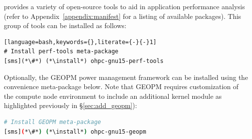\OHPC{} provides a variety of open-source tools to aid in application
performance analysis (refer to Appendix~\ref{appendix:manifest} for a listing
of available packages). This group of tools can be installed as follows:

\begin{lstlisting}[language=bash,keywords={},literate={-}{-}1]
# Install perf-tools meta-package
[sms](*\#*) (*\install*) ohpc-gnu15-perf-tools
\end{lstlisting}

\noindent Optionally, the GEOPM power management framework can be installed
using the convenience meta-package below. Note that GEOPM
requires customization of the compute node environment to include an additional
kernel module as highlighted previously in \S\ref{sec:add_geopm}):

\begin{lstlisting}[language=bash,keywords={},upquote=true]
# Install GEOPM meta-package
[sms](*\#*) (*\install*) ohpc-gnu15-geopm

\end{lstlisting}
